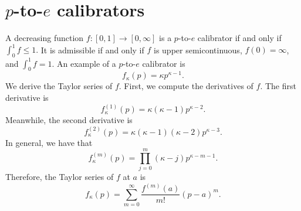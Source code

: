 \documentclass[12pt]{article}
\begin{document}
\section{$p$-to-$e$ calibrators}
A decreasing function $f : [0,1] \to [0,\infty]$ is a $p$-to-$e$ calibrator if and only if $\int_0^1 f \leq 1.$ It is admissible if and only if $f$ is upper semicontinuous, $f(0) = \infty$, and $\int_0^1 f = 1.$ An example of a $p$-to-$e$ calibrator is
$$f_\kappa(p) = \kappa p^{\kappa - 1}.$$
We derive the Taylor series of $f$. First, we compute the derivatives of $f$. The first derivative is 
$$f_\kappa^{(1)}(p) = \kappa(\kappa - 1) p^{\kappa - 2}.$$
Meanwhile, the second derivative is
$$f^{(2)}_\kappa(p) = \kappa(\kappa - 1) (\kappa - 2) p^{\kappa - 3}.$$ In general, we have that
$$f^{(m)}_\kappa(p) = \prod_{j=0}^m (\kappa - j)p^{\kappa - m- 1}.$$ Therefore, the Taylor series of $f$ at $a$ is
$$ f_\kappa(p) = \sum_{m=0}^\infty \frac{f^{(m)}(a)}{m!} (p - a)^m.$$
\end{document}
